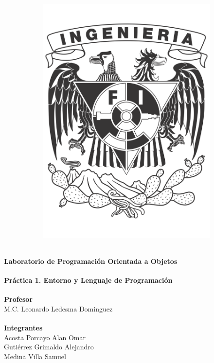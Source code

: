 \documentclass[12pt]{article}
\begin{document}
\begin{titlepage}
\begin{center}
\begin{figure}[ht]
\begin{subfigure}[l]{0.2\textwidth}
                    \includegraphics[width=\textwidth]{Escudo_FI.png}
                \end{subfigure} 
            \end{figure}

            \Huge \textbf{\\Laboratorio de Programación Orientada a Objetos\\}
            \huge\textbf{\\Práctica 1. Entorno y Lenguaje de Programación\\}
            \textbf{\\Profesor\\}
            \Large{M.C. Leonardo Ledesma Dominguez \\}
            \huge \textbf{\\Integrantes\\}
            \Large{Acosta Porcayo Alan Omar\\ Gutiérrez Grimaldo Alejandro\\Medina Villa Samuel}
        \end{center}
    \end{titlepage}
\end{document}
